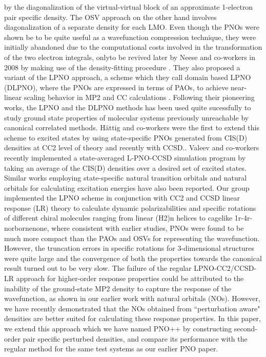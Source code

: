 by the diagonalization of the virtual-virtual block of an approximate 1-electron pair specific density. 
The OSV approach on the other hand involves diagonalization of a separate density for each LMO. Even though 
the PNOs were shown be to be quite useful as a wavefunction compression technique, they were initially 
abandoned due to the computational costs involved in the transformation of the two electron 
integrals, onlyto be revived later by Neese and co-workers in 2008 by making use of the density-fitting procedure
\cite{Neese09,NeeseCCSD09}. They also proposed a variant of the LPNO approach, a scheme which they call domain based LPNO (DLPNO), 
where the PNOs are expressed in terms of PAOs, to achieve near-linear scaling behavior in MP2 and CC calculations
\cite{Riplinger16}. Following their pioneering works, the LPNO and the DLPNO methods has been used quite sucessfully to study 
ground state properties of molecular systems previously unreachable by canonical correlated methods. 
H{\"a}ttig and co-workers were the first to extend this scheme to excited states by using state-specific 
PNOs generated from CIS(D) densities at CC2 level of theory\cite{Hattig13} and recently with CCSD.\cite{Hattig18}. Valeev and 
co-workers\cite{Chong18} recently implemented a state-averaged L-PNO-CCSD simulation program by taking an average of the 
CIS(D) densities over a desired set of excited states. Similar works employing state-specific natural 
transition orbitals and natural orbitals for calculating excitation energies have also been reported\cite{Mester17,Mester18,Baudin17,HofenerKlopper17}. Our group implemented the LPNO scheme in conjunction with CC2 and CCSD linear response (LR) theory  
to calculate dynamic polarizabilities and specific rotations of different chiral molecules ranging from linear
(H2)n helices to cagelike 1r-4r-norbornenone, where consistent with earlier studies, PNOs were found
to be much more compact than the PAOs and OSVs for representing the wavefunction. However, the truncation errors 
in specific rotations for 3-dimensional structures were quite large and the convergence of both the properties 
towards the canonical result turned out to be very slow\cite{McAlexander15:LRCC}. The failure of the regular LPNO-CC2/CCSD-LR approach
for higher-order response properties could be attributed to the inability of the ground-state MP2 density to 
capture the response of the wavefunction, as shown in our earlier work with natural orbitals (NOs)\cite{Kumar17}. However,
we have recently demonstrated that the NOs obtained from ``perturbation aware" densities are better suited
for calculating these response properties.\cite{Kumar18:1} In this paper, we extend this approach which we have named 
PNO++ by constructing second-order pair specific perturbed densities, and compare its performance with 
the regular method for the same test systems as our earlier PNO paper.
